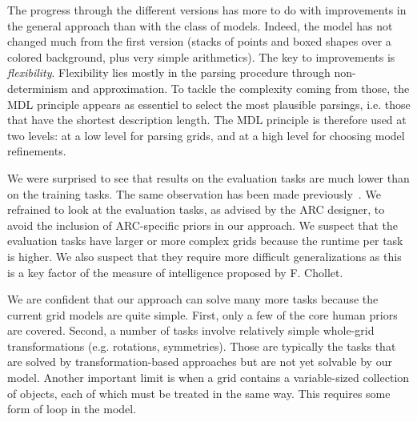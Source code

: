 \documentclass[a4paper]{llncs}
\begin{document}
The progress through the different versions has more to do with
improvements in the general approach than with the class of
models. Indeed, the model has not changed much from the first version
(stacks of points and boxed shapes over a colored background, plus
very simple arithmetics). The key to improvements is {\em
  flexibility}. Flexibility lies mostly in the parsing procedure
through non-determinism and approximation. To tackle the complexity
coming from those, the MDL principle appears as essentiel to select
the most plausible parsings, i.e. those that have the shortest
description length. The MDL principle is therefore used at two levels:
at a low level for parsing grids, and at a high level for choosing
model refinements.

We were surprised to see that results on the evaluation tasks are much
lower than on the training tasks. The same observation has been made
previously~\cite{Fischer2020}. We refrained to look at the evaluation
tasks, as advised by the ARC designer, to avoid the inclusion of
ARC-specific priors in our approach. We suspect that the evaluation
tasks have larger or more complex grids because the runtime per task
is higher. We also suspect that they require more difficult
generalizations as this is a key factor of the measure of intelligence
proposed by F. Chollet.

We are confident that our approach can solve many more tasks because
the current grid models are quite simple. First, only a few of the
core human priors are covered. Second, a number of tasks involve
relatively simple whole-grid transformations (e.g. rotations,
symmetries). Those are typically the tasks that are solved by
transformation-based approaches but are not yet solvable by our
model. Another important limit is when a grid contains a
variable-sized collection of objects, each of which must be treated in
the same way. This requires some form of loop in the model.


%
%
\end{document}
